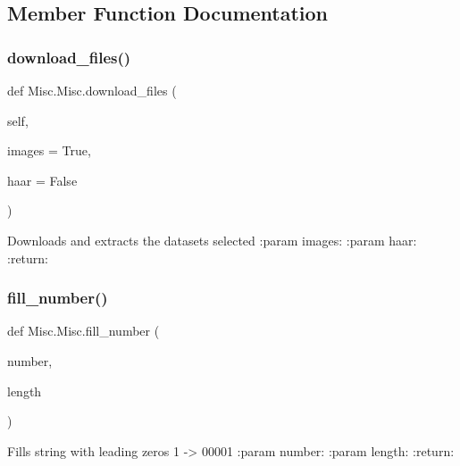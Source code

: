 \subsection{Member Function Documentation}
\mbox{\label{class_misc_1_1_misc_af3f58245bac7eefdc5a266a06bd1cb85}} 
\subsubsection{\texorpdfstring{download\+\_\+files()}{download\_files()}}
{\footnotesize\ttfamily def Misc.\+Misc.\+download\+\_\+files (\begin{DoxyParamCaption}\item[{}]{self,  }\item[{}]{images = {\ttfamily True},  }\item[{}]{haar = {\ttfamily False} }\end{DoxyParamCaption})}

\begin{DoxyVerb}Downloads and extracts the datasets selected
:param images:
:param haar:
:return:
\end{DoxyVerb}
 \mbox{\label{class_misc_1_1_misc_a58fba0bed4c5f2ff76cdf83e20670fb4}} 
\subsubsection{\texorpdfstring{fill\+\_\+number()}{fill\_number()}}
{\footnotesize\ttfamily def Misc.\+Misc.\+fill\+\_\+number (\begin{DoxyParamCaption}\item[{}]{number,  }\item[{}]{length }\end{DoxyParamCaption})\hspace{0.3cm}{\ttfamily [static]}}

\begin{DoxyVerb}Fills string with leading zeros 1 -> 00001
:param number:
:param length:
:return:
\end{DoxyVerb}
 \mbox{\label{class_misc_1_1_misc_a8d30d14e25c28f7f8ac3798e501d4aaa}} 
